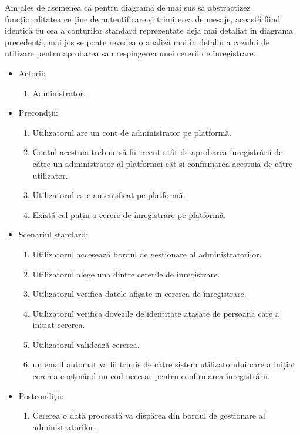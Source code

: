 \documentclass[12pt,a4paper,hidelinks]{report}
\theoremstyle{definition}
\theoremstyle{remark}
\begin{document}
Am ales de asemenea că pentru diagramă de mai sus să abstractizez funcționalitatea ce ține de autentificare și trimiterea de mesaje, această fiind identică cu cea a conturilor standard reprezentate deja mai detaliat în diagrama precedentă, mai jos se poate revedea o analiză mai în detaliu a cazului de utilizare pentru aprobarea sau respingerea unei cererii de înregistrare.
\begin{itemize}
    \item {Actorii:
        \begin{enumerate}
            \item Administrator.
        \end{enumerate}}
    \item {Precond\c tii:
        \begin{enumerate}
            \item Utilizatorul are un cont de administrator pe platformă.
            \item Contul acestuia trebuie să fii trecut atât de aprobarea înregistrării de către un administrator al platformei cât și confirmarea acestuia de către utilizator.
            \item Utilizatorul este autentificat pe platformă.
            \item Există cel puțin o cerere de înregistrare pe platformă.
        \end{enumerate}}
    \item {Scenariul standard:
        \begin{enumerate}
            \item Utilizatorul accesează bordul de gestionare al administratorilor.
            \item Utilizatorul alege una dintre cererile de înregistrare.
            \item Utilizatorul verifica datele afișate in cererea de înregistrare.
            \item Utilizatorul verifica dovezile de identitate atașate de persoana care a inițiat cererea.
            \item Utilizatorul validează cererea.
            \item un email automat va fii trimis de către sistem utilizatorului care a inițiat cererea conținând un cod necesar pentru confirmarea înregistrării.    
        \end{enumerate}}
    \item {Postcondi\c tii:
        \begin{enumerate}
            \item Cererea o dată procesată va dispărea din bordul de gestionare al administratorilor.

\end{enumerate}}
\end{itemize}
\end{document}
